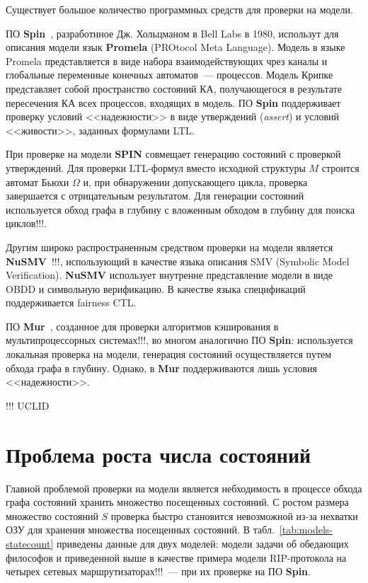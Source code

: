 \documentclass[a4paper,notitlepage,14pt]{article}
\begin{document}
Существует большое количество программных средств для проверки на модели. 

ПО \textbf{Spin}~\cite{SpinRoot}, разработнное Дж. Хольцманом в Bell Labs в 1980,
использут для описания модели язык \textbf{Promela} (PROtocol Meta Language). Модель в
языке Promela представляется в виде набора взаимодействующих чрез каналы и глобальные
переменные конечных автоматов~--- процессов. Модель Крипке представляет собой пространство
состояний КА, получающегося в результате пересечения КА всех процессов, входящих в
модель. ПО \textbf{Spin} поддерживает проверку условий <<надежности>> в виде утверждений
(\emph{assert}) и условий <<живости>>, заданных формулами LTL.

При проверке на модели \textbf{SPIN} совмещает генерацию состояний с проверкой утверждений. Для
проверки LTL-формул вместо исходной структуры $M$ строится автомат Бьюхи $\Omega$ и, при
обнаружении допускающего цикла, проверка завершается с отрицательным результатом. Для
генерации состояний используется обход графа в глубину с вложенным обходом в глубину для
поиска циклов!!!.

Другим широко распространенным средством проверки на модели является
\textbf{NuSMV}~\cite{Cimatti00nusmv:a}!!!, использующий в качестве языка описания SMV
(Symbolic Model Verification). \textbf{NuSMV} использует внутренне представление модели в
виде OBDD и символьную верификацию. В качестве языка спецификаций поддерживается fairness
CTL.

ПО \textbf{Mur\phi}~\cite{Dill96murphi}, созданное для проверки алгоритмов кэширования в
мультипроцессорных системах!!!, во многом аналогично ПО \textbf{Spin}: используется
локальная проверка на модели, генерация состояний осуществляется путем обхода графа в
глубину. Однако, в \textbf{Mur\phi} поддерживаются лишь условия <<надежности>>.

!!! UCLID

\section{Проблема роста числа состояний}
\label{sec:state-explosion}

Главной проблемой проверки на модели является небходимость в процессе обхода графа
состояний хранить множество посещенных состояний. С ростом размера множество состояний $S$
проверка быстро становится невозможной из-за нехватки ОЗУ для хранения множества
посещенных состояний. В табл.~\ref{tab:models-statecount} приведены данные для двух
моделей: модели задачи об обедающих философов и приведенной выше в качестве примера модели
RIP-протокола на четырех сетевых маршрутизаторах!!!~--- при их проверке на ПО
\textbf{Spin}.
\end{document}
